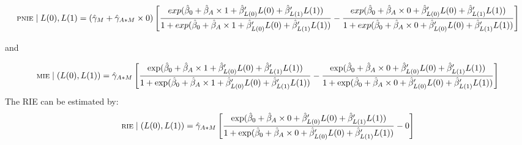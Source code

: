 \documentclass[
]{book}
\begin{document}
\[\scriptsize \text{PNIE} \mid L(0), L(1) = \left( \hat{\gamma}_M + \hat{\gamma}_{A \ast M} \times 0 \right) \left[ \frac{exp(\hat{\beta}_0 + \hat{\beta}_A \times 1 + \hat{\beta}_{L(0)}^\prime L(0) + \hat{\beta}_{L(1)}^\prime L(1))}{1 + exp(\hat{\beta}_0 + \hat{\beta}_A \times 1 + \hat{\beta}_{L(0)}^\prime L(0) + \hat{\beta}_{L(1)}^\prime L(1))} - \frac{exp(\hat{\beta}_0 + \hat{\beta}_A \times 0 + \hat{\beta}_{L(0)}^\prime L(0) + \hat{\beta}_{L(1)}^\prime L(1))}{1 + exp(\hat{\beta}_0 + \hat{\beta}_A \times 0 + \hat{\beta}_{L(0)}^\prime L(0) + \hat{\beta}_{L(1)}^\prime L(1))}\right]\]

and

\[ \scriptsize \text{MIE} \mid (L(0), L(1)) = \hat{\gamma}_{A \ast M} \left[ \frac{\exp (\hat{\beta}_0 + \hat{\beta}_A \times 1 + \hat{\beta}_{L(0)}^\prime L(0) + \hat{\beta}_{L(1)}^\prime L(1))}{1 + \exp (\hat{\beta}_0 + \hat{\beta}_A \times 1 + \hat{\beta}_{L(0)}^\prime L(0) + \hat{\beta}_{L(1)}^\prime L(1))} - \frac{\exp (\hat{\beta}_0 + \hat{\beta}_A \times 0 + \hat{\beta}_{L(0)}^\prime L(0) + \hat{\beta}_{L(1)}^\prime L(1))}{1 + \exp (\hat{\beta}_0 + \hat{\beta}_A \times 0 + \hat{\beta}_{L(0)}^\prime L(0) + \hat{\beta}_{L(1)}^\prime L(1))}\right]\]
The RIE can be estimated by:
\[\scriptsize
\text{RIE} \mid (L(0), L(1)) = \hat{\gamma}_{A \ast M} \left[ \frac{\exp (\hat{\beta}_0 + \hat{\beta}_A \times 0 + \hat{\beta}_{L(0)}^\prime L(0) + \hat{\beta}_{L(1)}^\prime L(1))}{1 + \exp (\hat{\beta}_0 + \hat{\beta}_A \times 0 + \hat{\beta}_{L(0)}^\prime L(0) + \hat{\beta}_{L(1)}^\prime L(1))} - 0 \right]\]
\end{document}
